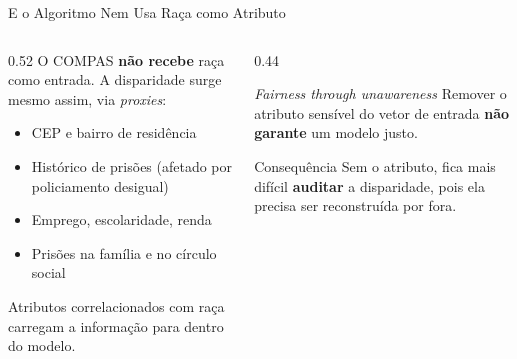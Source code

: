 \documentclass[aspectratio=169,xcolor=dvipsnames]{beamer}
\begin{document}
  \begin{frame}{E o Algoritmo Nem Usa Raça como Atributo}
    \begin{columns}[T]
      \begin{column}{0.52\textwidth}
        O COMPAS \textbf{não recebe} raça como entrada. A disparidade surge mesmo assim, via \textit{proxies}:
        \begin{itemize}\setlength{\itemsep}{0.2em}
          \item CEP e bairro de residência
          \item Histórico de prisões (afetado por policiamento desigual)
          \item Emprego, escolaridade, renda
          \item Prisões na família e no círculo social
        \end{itemize}

        \vspace{0.3em}
        Atributos correlacionados com raça carregam a informação para dentro do modelo.
      \end{column}
      \begin{column}{0.44\textwidth}
        \begin{block}{\textit{Fairness through unawareness}}
          Remover o atributo sensível do vetor de entrada \textbf{não garante} um modelo justo.
        \end{block}
        \begin{alertblock}{Consequência}
          Sem o atributo, fica mais difícil \textbf{auditar} a disparidade, pois ela precisa ser reconstruída por fora.
        \end{alertblock}
      \end{column}
    \end{columns}
  \end{frame}
\end{document}

